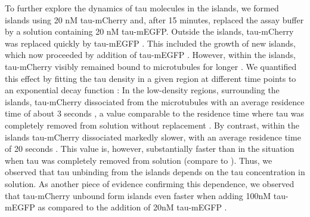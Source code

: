 To further explore the dynamics of tau molecules in the islands, we formed islands using 20 nM tau-mCherry and, after 15 minutes, replaced the assay buffer by a solution containing 20 nM tau-mEGFP. Outside the islands, tau-mCherry was replaced quickly by tau-mEGFP . This included the growth of new islands, which now proceeded by addition of tau-mEGFP . However, within the islands, tau-mCherry visibly remained bound to microtubules for longer . We quantified this effect by fitting the tau density in a given region at different time points to an exponential decay function : In the low-density regions, surrounding the islands, tau-mCherry dissociated from the microtubules with an average residence time of about 3 seconds , a value comparable to the residence time where tau was completely removed from solution without replacement . By contrast, within the islands tau-mCherry dissociated markedly slower, with an average residence time of 20  seconds . This value is, however, substantially faster than in the situation when tau was completely removed from solution (compare to ). Thus, we observed that tau unbinding from the islands depends on the tau concentration in solution. As another piece of evidence confirming this dependence, we observed that tau-mCherry unbound form islands even faster when adding 100nM tau-mEGFP as compared to the addition of 20nM tau-mEGFP .\par

